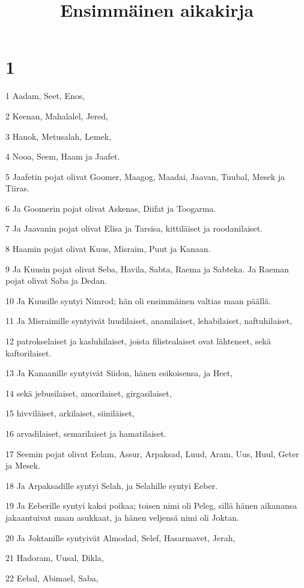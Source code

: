 

\title{Ensimmäinen aikakirja}


\chapter{1}

\par 1 Aadam, Seet, Enos,
\par 2 Keenan, Mahalalel, Jered,
\par 3 Hanok, Metusalah, Lemek,
\par 4 Nooa, Seem, Haam ja Jaafet.
\par 5 Jaafetin pojat olivat Goomer, Maagog, Maadai, Jaavan, Tuubal, Mesek ja Tiiras.
\par 6 Ja Goomerin pojat olivat Askenas, Diifat ja Toogarma.
\par 7 Ja Jaavanin pojat olivat Elisa ja Tarsisa, kittiläiset ja roodanilaiset.
\par 8 Haamin pojat olivat Kuus, Misraim, Puut ja Kanaan.
\par 9 Ja Kuusin pojat olivat Seba, Havila, Sabta, Raema ja Sabteka. Ja Raeman pojat olivat Saba ja Dedan.
\par 10 Ja Kuusille syntyi Nimrod; hän oli ensimmäinen valtias maan päällä.
\par 11 Ja Misraimille syntyivät luudilaiset, anamilaiset, lehabilaiset, naftuhilaiset,
\par 12 patrokselaiset ja kasluhilaiset, joista filistealaiset ovat lähteneet, sekä kaftorilaiset.
\par 13 Ja Kanaanille syntyivät Siidon, hänen esikoisensa, ja Heet,
\par 14 sekä jebusilaiset, amorilaiset, girgasilaiset,
\par 15 hivviläiset, arkilaiset, siiniläiset,
\par 16 arvadilaiset, semarilaiset ja hamatilaiset.
\par 17 Seemin pojat olivat Eelam, Assur, Arpaksad, Luud, Aram, Uus, Huul, Geter ja Mesek.
\par 18 Ja Arpaksadille syntyi Selah, ja Selahille syntyi Eeber.
\par 19 Ja Eeberille syntyi kaksi poikaa; toisen nimi oli Peleg, sillä hänen aikanansa jakaantuivat maan asukkaat, ja hänen veljensä nimi oli Joktan.
\par 20 Ja Joktanille syntyivät Almodad, Selef, Hasarmavet, Jerah,
\par 21 Hadoram, Uusal, Dikla,
\par 22 Eebal, Abimael, Saba,
